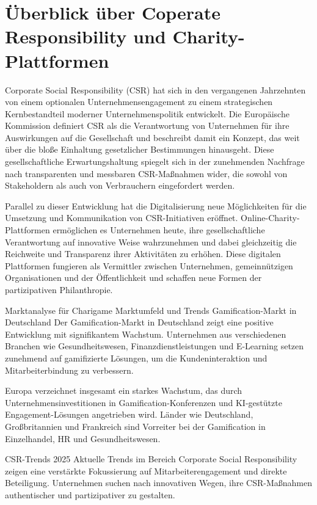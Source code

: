 \section{Überblick über Coperate Responsibility und Charity-Plattformen}
Corporate Social Responsibility (CSR) hat sich in den vergangenen Jahrzehnten von einem optionalen Unternehmensengagement zu einem strategischen Kernbestandteil moderner Unternehmenspolitik entwickelt.
Die Europäische Kommission definiert CSR als die Verantwortung von Unternehmen für ihre Auswirkungen auf die Gesellschaft und beschreibt damit ein Konzept, das weit über die bloße Einhaltung gesetzlicher Bestimmungen hinausgeht.\cite{european_commission2011csr}
Diese gesellschaftliche Erwartungshaltung spiegelt sich in der zunehmenden Nachfrage nach transparenten und messbaren CSR-Maßnahmen wider, die sowohl von Stakeholdern als auch von Verbrauchern eingefordert werden.

Parallel zu dieser Entwicklung hat die Digitalisierung neue Möglichkeiten für die Umsetzung und Kommunikation von CSR-Initiativen eröffnet.
Online-Charity-Plattformen ermöglichen es Unternehmen heute, ihre gesellschaftliche Verantwortung auf innovative Weise wahrzunehmen und dabei gleichzeitig die Reichweite und Transparenz ihrer Aktivitäten zu erhöhen.
Diese digitalen Plattformen fungieren als Vermittler zwischen Unternehmen, gemeinnützigen Organisationen und der Öffentlichkeit und schaffen neue Formen der partizipativen Philanthropie.


Marktanalyse für Charigame
Marktumfeld und Trends
Gamification-Markt in Deutschland
Der Gamification-Markt in Deutschland zeigt eine positive Entwicklung mit signifikantem Wachstum.
Unternehmen aus verschiedenen Branchen wie Gesundheitswesen, Finanzdienstleistungen und E-Learning setzen zunehmend auf gamifizierte Lösungen, um die Kundeninteraktion und Mitarbeiterbindung zu verbessern.

Europa verzeichnet insgesamt ein starkes Wachstum, das durch Unternehmensinvestitionen in Gamification-Konferenzen und KI-gestützte Engagement-Lösungen angetrieben wird.
Länder wie Deutschland, Großbritannien und Frankreich sind Vorreiter bei der Gamification in Einzelhandel, HR und Gesundheitswesen.

CSR-Trends 2025
Aktuelle Trends im Bereich Corporate Social Responsibility zeigen eine verstärkte Fokussierung auf Mitarbeiterengagement und direkte Beteiligung.
Unternehmen suchen nach innovativen Wegen, ihre CSR-Maßnahmen authentischer und partizipativer zu gestalten.


